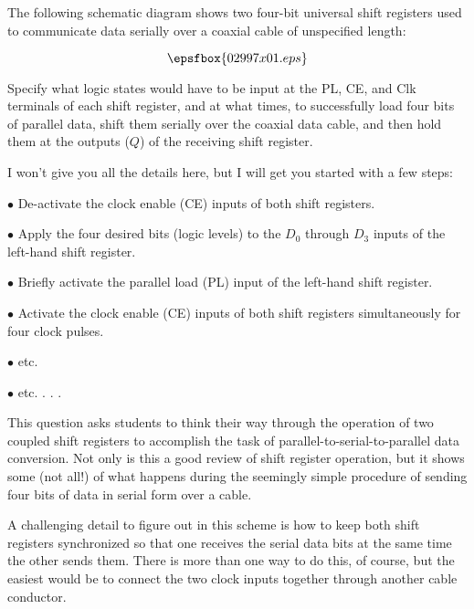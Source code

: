 

The following schematic diagram shows two four-bit universal shift registers used to communicate data serially over a coaxial cable of unspecified length:

$$\epsfbox{02997x01.eps}$$

Specify what logic states would have to be input at the PL, CE, and Clk terminals of each shift register, and at what times, to successfully load four bits of parallel data, shift them serially over the coaxial data cable, and then hold them at the outputs ($Q$) of the receiving shift register.







I won't give you all the details here, but I will get you started with a few steps:

\medskip
\item{$\bullet$} De-activate the clock enable (CE) inputs of both shift registers.
\item{$\bullet$} Apply the four desired bits (logic levels) to the $D_0$ through $D_3$ inputs of the left-hand shift register.
\item{$\bullet$} Briefly activate the parallel load (PL) input of the left-hand shift register.
\item{$\bullet$} Activate the clock enable (CE) inputs of both shift registers simultaneously for four clock pulses.
\item{$\bullet$} etc.
\item{$\bullet$} etc. . . .
\medskip







This question asks students to think their way through the operation of two coupled shift registers to accomplish the task of parallel-to-serial-to-parallel data conversion.  Not only is this a good review of shift register operation, but it shows some (not all!) of what happens during the seemingly simple procedure of sending four bits of data in serial form over a cable.

A challenging detail to figure out in this scheme is how to keep both shift registers synchronized so that one receives the serial data bits at the same time the other sends them.  There is more than one way to do this, of course, but the easiest would be to connect the two clock inputs together through another cable conductor.





